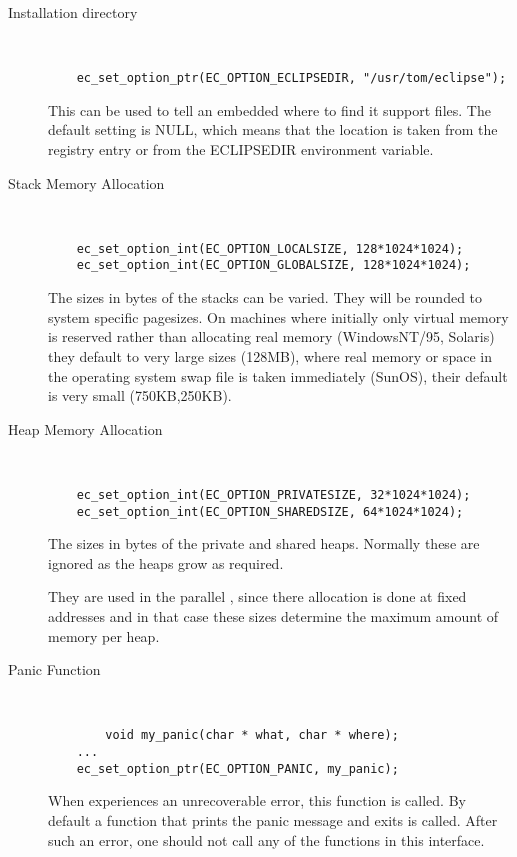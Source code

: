 \begin{description}
\item[Installation directory]\ \\
\begin{verbatim}
	ec_set_option_ptr(EC_OPTION_ECLIPSEDIR, "/usr/tom/eclipse");
\end{verbatim}
This can be used to tell an embedded {\eclipse} where to find it support files.
The default setting is NULL, which means that the location is
taken from the registry entry or from the ECLIPSEDIR environment variable.


\item[Stack Memory Allocation]\ \\
\begin{verbatim}
	ec_set_option_int(EC_OPTION_LOCALSIZE, 128*1024*1024);
	ec_set_option_int(EC_OPTION_GLOBALSIZE, 128*1024*1024);
\end{verbatim}
The sizes in bytes of the stacks can be varied. They will be rounded to
system specific pagesizes. On machines where initially only virtual memory
is reserved rather than allocating real memory (WindowsNT/95, Solaris) they
default to very large sizes (128MB), where real memory or space in the
operating system swap file is taken immediately (SunOS), their default
is very small (750KB,250KB).


\item[Heap Memory Allocation]\ \\
\begin{verbatim}
	ec_set_option_int(EC_OPTION_PRIVATESIZE, 32*1024*1024);
	ec_set_option_int(EC_OPTION_SHAREDSIZE, 64*1024*1024);
\end{verbatim}
The sizes in bytes of the private and shared heaps. Normally these are
ignored as the heaps grow as required.

They are used in the parallel {\eclipse}, since there allocation is done
at fixed addresses and in that case these sizes  determine the maximum
amount of memory per heap.


\item[Panic Function]\ \\
\begin{verbatim}
        void my_panic(char * what, char * where);
	...
	ec_set_option_ptr(EC_OPTION_PANIC, my_panic);
\end{verbatim}
When {\eclipse} experiences an unrecoverable error, this function
is called. By default a function that prints the panic message
and exits is called. After such an error, one should not call any
of the functions in this interface.



\end{description}
